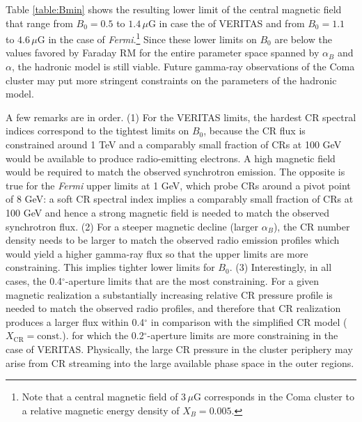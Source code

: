 \documentclass[12pt,manuscript]{aastex}
\newcommand{\rmn}{\mathrm}
\newcommand{\CR}{\mathrm{CR}}
\begin{document}
Table \ref{table:Bmin} shows the resulting lower limit of the central magnetic field that
range from $B_{0} = 0.5$ to $1.4\,\mu$G in case the of VERITAS and from
$B_{0} = 1.1$ to $4.6\,\mu$G in the case of \emph{Fermi}.\footnote{Note that a central magnetic
field of $3\,\mu$G corresponds 
in the Coma cluster to a relative magnetic energy density of $X_B=0.005$.} Since these lower limits
on $B_{0}$ are below the values favored by Faraday RM for the entire parameter space spanned by
$\alpha_{B}$ and $\alpha$, the hadronic model is still viable. Future gamma-ray observations of
the Coma cluster may put more stringent constraints on the parameters of the hadronic model.

A few remarks are in order. (1) For the VERITAS limits, the hardest
CR spectral indices correspond to the tightest limits on $B_{0}$, because the CR flux is constrained
around 1 TeV and a comparably small fraction of CRs at 100 GeV would be available to produce
radio-emitting electrons. A high magnetic field would be required to match the observed
synchrotron emission. The opposite is true for the \emph{Fermi} upper limits at 1 GeV, which
probe CRs around a pivot point of 8 GeV: a soft CR spectral index implies a comparably small
fraction of CRs at 100 GeV and hence a strong magnetic field is needed to match the observed
synchrotron flux. (2) For a steeper
magnetic decline (larger $\alpha_{B}$), the CR number density needs to be larger to match the
observed radio emission profiles which would yield a higher gamma-ray flux so that the upper limits
are more constraining. This implies tighter lower limits for $B_{0}$.  (3) Interestingly, in all
cases, the 0.4$^{\circ}$-aperture limits that are the most constraining. For a given magnetic
realization a substantially increasing relative CR pressure profile is needed to match the
observed radio profiles, and therefore that CR realization produces a larger flux within 0.4$^{\circ}$
in comparison with the simplified CR model ($X_{\CR} = \rmn{const.}$). for which the
0.2$^{\circ}$-aperture limits are more constraining in the case of VERITAS. Physically, the large
CR pressure in the cluster periphery may arise from CR streaming into the large available phase
space in the outer regions.
\end{document}
